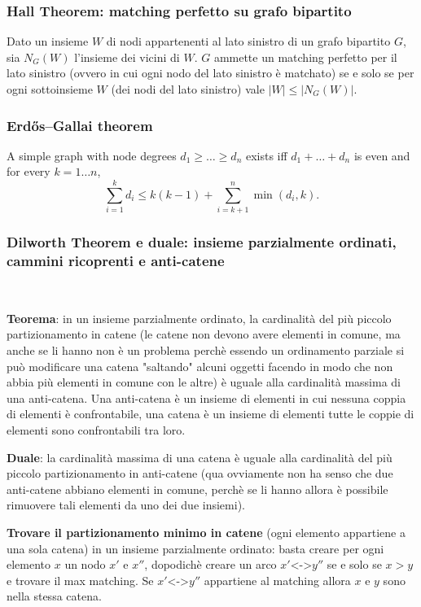 \subsubsection{Hall Theorem: matching perfetto su grafo bipartito}
Dato un insieme $W$ di nodi appartenenti al lato sinistro di un grafo bipartito $G$, sia $N_G(W)$ l'insieme dei vicini di $W$. $G$ ammette un matching perfetto per il lato sinistro (ovvero in cui ogni nodo del lato sinistro è matchato) se e solo se per ogni sottoinsieme $W$ (dei nodi del lato sinistro) vale $|W|\leq|N_G(W)|$.

\subsubsection{Erdős–Gallai theorem}
		A simple graph with node degrees $d_1 \ge \dots \ge d_n$ exists iff $d_1 + \dots + d_n$ is even and for every $k = 1\dots n$,
		\[ \sum _{i=1}^{k}d_{i}\leq k(k-1)+\sum _{i=k+1}^{n}\min(d_{i},k). \]

\subsubsection{Dilworth Theorem e duale: insieme parzialmente ordinati, cammini ricoprenti e anti-catene}
\,

\textbf{Teorema}: in un insieme parzialmente ordinato, la cardinalità del più piccolo partizionamento in catene (le catene non devono avere elementi in comune, ma anche se li hanno 
non è un problema perchè essendo un ordinamento parziale si può modificare una catena  "saltando" alcuni oggetti facendo in modo che non abbia più elementi in comune con le altre) è
uguale alla cardinalità massima di una anti-catena. Una anti-catena è un insieme di elementi in cui nessuna coppia di elementi è confrontabile, una catena è un insieme di elementi 
tutte le coppie di elementi sono  confrontabili tra loro. 

\textbf{Duale}: la cardinalità massima di una catena è uguale alla cardinalità del più piccolo partizionamento in anti-catene (qua 
ovviamente non ha senso che due anti-catene abbiano elementi in comune, perchè se li hanno allora è possibile rimuovere tali elementi da uno dei due insiemi). 

\textbf{Trovare il partizionamento minimo in catene} (ogni elemento appartiene a una sola catena) in un insieme parzialmente ordinato: basta creare per ogni elemento $x$ un nodo $x'$ e $x''$, dopodichè creare un arco $x'$<->$y''$ se e solo se $x>y$ e trovare il max matching. Se
$x'$<->$y''$ appartiene al matching allora $x$ e $y$ sono nella stessa catena. 

